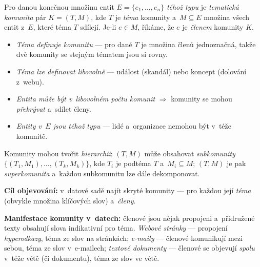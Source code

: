 \documentclass[11pt,a4paper]{article}
\theoremstyle{definition}
\begin{document}
\begin{defbox}
Pro danou konečnou množinu entit $E=\{e_1,\dots,e_n\}$ \emph{téhož typu} je \emph{tematická
komunita} pár $K=(T,M)$, kde $T$ je \emph{téma} komunity a~$M\subseteq E$ množina všech entit
z~$E$, které téma $T$ sdílejí. Je-li $e\in M$, říkáme, že $e$ je \emph{členem} komunity $K$.
\begin{itemize}
\item \emph{Téma definuje komunitu} --- pro dané $T$ je množina členů jednoznačná, takže dvě
      komunity se stejným tématem jsou si rovny.
\item \emph{Téma lze definovat libovolně} --- událost (skandál) nebo koncept (dolování z~webu).
\item \emph{Entita může být v~libovolném počtu komunit} $\Rightarrow$ komunity se mohou
      \emph{překrývat} a~sdílet členy.
\item \emph{Entity v~$E$ jsou téhož typu} --- lidé a~organizace nemohou být v~téže komunitě.
\end{itemize}
Komunity mohou tvořit \emph{hierarchii}: $(T,M)$ může obsahovat \emph{subkomunity}
$\{(T_1,M_1),\dots,(T_k,M_k)\}$, kde $T_i$ je podtéma $T$ a~$M_i\subseteq M$; $(T,M)$ je pak
\emph{superkomunita} a~každou subkomunitu lze dále dekomponovat.

\textbf{Cíl objevování:} v~datové sadě najít skryté komunity --- pro každou její \emph{téma}
(obvykle množina klíčových slov) a~\emph{členy}.
\end{defbox}

\textbf{Manifestace komunity v~datech:} členové jsou nějak propojeni a~přidružené texty obsahují
slova indikativní pro téma. \emph{Webové stránky} --- propojení \emph{hyperodkazy}, téma ze slov
na stránkách; \emph{e-maily} --- členové komunikují mezi sebou, téma ze slov v~e-mailech;
\emph{textové dokumenty} --- členové se objevují \emph{spolu} v~téže větě (či dokumentu), téma
ze slov ve větě.
\end{document}
